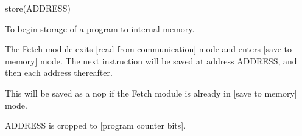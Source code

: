 

\format
store(ADDRESS)

\purpose

To begin storage of a program to internal memory.

\description

The Fetch module exits [read from communication] mode and enters [save to memory] mode.
The next instruction will be saved at address ADDRESS, and then each address thereafter.

\notes

This will be saved as a nop if the Fetch module is already in [save to memory] mode.

ADDRESS is cropped to [program counter bits].
